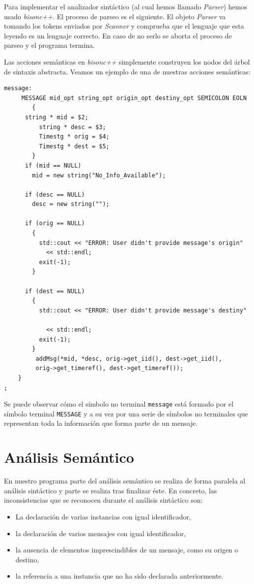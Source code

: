 Para implementar el analizador sintáctico (al cual hemos llamado
\textit{Parser}) hemos usado \textit{bisonc++}. El proceso de parseo
es el siguiente. El objeto \textit{Parser} va tomando los tokens
enviados por \textit{Scanner} y comprueba que el lenguaje que esta
leyendo es un lenguaje correcto. En caso de no serlo se aborta el
proceso de parseo y el programa termina.

Las acciones semánticas en \emph{bisonc++} simplemente construyen los
nodos del árbol de sintaxis abstracta. Veamos un ejemplo de una de
nuestras acciones semánticas: 
{}
\begin{lstlisting}
message:
     MESSAGE mid_opt string_opt origin_opt destiny_opt SEMICOLON EOLN
        { 
	  string * mid = $2;
          string * desc = $3;
          Timestg * orig = $4;
          Timestg * dest = $5;
        }
	  if (mid == NULL)
	    mid = new string("No_Info_Available");

	  if (desc == NULL)
	    desc = new string("");

	  if (orig == NULL)
	    {
	      std::cout << "ERROR: User didn't provide message's origin" 
			<< std::endl;
	      exit(-1);
	    }

	  if (dest == NULL)
	    {
	      std::cout << "ERROR: User didn't provide message's destiny" 

			<< std::endl;
	      exit(-1);
	    }
	     addMsg(*mid, *desc, orig->get_iid(), dest->get_iid(), 
		 orig->get_timeref(), dest->get_timeref());
	}
;
\end{lstlisting}

Se puede observar cómo el símbolo no terminal \lstinline{message} está
formado por el símbolo terminal \lstinline{MESSAGE} y a su vez por una
serie de símbolos no terminales que representan toda la información
que forma parte de un mensaje.

\section{Análisis Semántico}

En nuestro programa parte del análisis semántico se realiza de forma
paralela al análisis sintáctico y parte se realiza tras finalizar
éste. En concreto, las inconsistencias que se reconocen durante el
análisis sintáctico son:
\begin{itemize}
\item La declaración de varias instancias con igual identificador,
\item la declaración de varios mensajes con igual identificador,
\item la ausencia de elementos imprescindibles de un mensaje, como su
  origen o destino, 
\item la referencia a una instancia que no ha sido declarada
  anteriormente.
\end{itemize}

